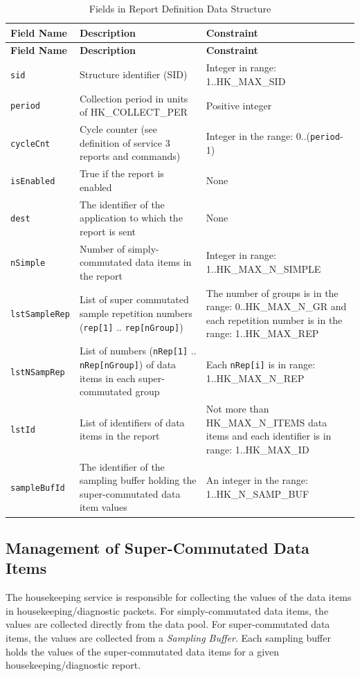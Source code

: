 \documentclass[a4paper,10pt]{article}
\begin{document}
\begin{longtable}{|l|p{5cm}|>{\raggedright\arraybackslash}p{6cm}|}
\caption{Fields in Report Definition Data Structure}\label{tab:repDefDataStruct} \\
\hline
\rowcolor{light-gray}
\textbf{Field Name} & \textbf{Description} & \textbf{Constraint} \\
\hline\hline
\endfirsthead
\rowcolor{light-gray}
\textbf{Field Name} & \textbf{Description} & \textbf{Constraint} \\
\hline\hline
\endhead
\texttt{sid} & Structure identifier (SID) & Integer in range: 1..HK\_MAX\_SID \\
\hline
\texttt{period} & Collection period in units of HK\_COLLECT\_PER & Positive integer \\
\hline
\texttt{cycleCnt} & Cycle counter (see definition of service 3 reports and commands) & Integer in the range: 0..(\texttt{period}-1) \\
\hline
\texttt{isEnabled} & True if the report is enabled & None  \\
\hline
\texttt{dest} & The identifier of the application to which the report is sent & None \\
\hline
\texttt{nSimple} & Number of simply-commutated data items in the report & Integer in range: 1..HK\_MAX\_N\_SIMPLE \\
\hline
\texttt{lstSampleRep} & List of super commutated sample repetition numbers (\texttt{rep[1]} .. \texttt{rep[nGroup]}) & The number of groups is in the range: 0..HK\_MAX\_N\_GR and each repetition number is in the range: 1..HK\_MAX\_REP \\
\hline
\texttt{lstNSampRep} & List of numbers (\texttt{nRep[1]} .. \texttt{nRep[nGroup]}) of data items in each super-commutated group & Each \texttt{nRep[i]} is in range: 1..HK\_MAX\_N\_REP \\
\hline
\texttt{lstId} & List of identifiers of data items in the report & Not more than HK\_MAX\_N\_ITEMS data items and each identifier is in range: 1..HK\_MAX\_ID \\
\hline
\texttt{sampleBufId} & The identifier of the sampling buffer holding the super-commutated data item values & An integer in the range: 1..HK\_N\_SAMP\_BUF \\
\hline
\end{longtable}  


\subsection{Management of Super-Commutated Data Items}\label{sec:serv3SupCommDataItems}
The housekeeping service is responsible for collecting the values of the data items in housekeeping/diagnostic packets. For simply-commutated data items, the values are collected directly from the data pool. For super-commutated data items, the values are collected from a \textit{Sampling Buffer}. Each sampling buffer holds the values of the super-commutated data items for a given housekeeping/diagnostic report.
\end{document}
